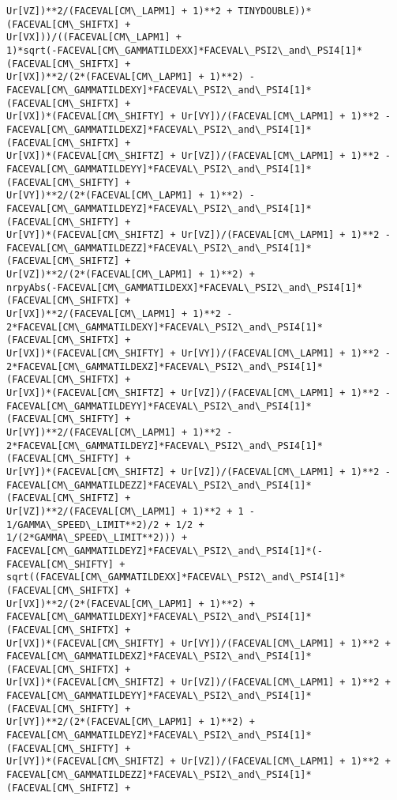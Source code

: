 \documentclass[landscape,letterpaper,10pt,english]{article}
\begin{document}
\begin{Verbatim}[commandchars=\\\{\}]
Ur[VZ])**2/(FACEVAL[CM\_LAPM1] + 1)**2 + TINYDOUBLE))*(FACEVAL[CM\_SHIFTX] +
Ur[VX]))/((FACEVAL[CM\_LAPM1] +
1)*sqrt(-FACEVAL[CM\_GAMMATILDEXX]*FACEVAL\_PSI2\_and\_PSI4[1]*(FACEVAL[CM\_SHIFTX] +
Ur[VX])**2/(2*(FACEVAL[CM\_LAPM1] + 1)**2) -
FACEVAL[CM\_GAMMATILDEXY]*FACEVAL\_PSI2\_and\_PSI4[1]*(FACEVAL[CM\_SHIFTX] +
Ur[VX])*(FACEVAL[CM\_SHIFTY] + Ur[VY])/(FACEVAL[CM\_LAPM1] + 1)**2 -
FACEVAL[CM\_GAMMATILDEXZ]*FACEVAL\_PSI2\_and\_PSI4[1]*(FACEVAL[CM\_SHIFTX] +
Ur[VX])*(FACEVAL[CM\_SHIFTZ] + Ur[VZ])/(FACEVAL[CM\_LAPM1] + 1)**2 -
FACEVAL[CM\_GAMMATILDEYY]*FACEVAL\_PSI2\_and\_PSI4[1]*(FACEVAL[CM\_SHIFTY] +
Ur[VY])**2/(2*(FACEVAL[CM\_LAPM1] + 1)**2) -
FACEVAL[CM\_GAMMATILDEYZ]*FACEVAL\_PSI2\_and\_PSI4[1]*(FACEVAL[CM\_SHIFTY] +
Ur[VY])*(FACEVAL[CM\_SHIFTZ] + Ur[VZ])/(FACEVAL[CM\_LAPM1] + 1)**2 -
FACEVAL[CM\_GAMMATILDEZZ]*FACEVAL\_PSI2\_and\_PSI4[1]*(FACEVAL[CM\_SHIFTZ] +
Ur[VZ])**2/(2*(FACEVAL[CM\_LAPM1] + 1)**2) +
nrpyAbs(-FACEVAL[CM\_GAMMATILDEXX]*FACEVAL\_PSI2\_and\_PSI4[1]*(FACEVAL[CM\_SHIFTX] +
Ur[VX])**2/(FACEVAL[CM\_LAPM1] + 1)**2 -
2*FACEVAL[CM\_GAMMATILDEXY]*FACEVAL\_PSI2\_and\_PSI4[1]*(FACEVAL[CM\_SHIFTX] +
Ur[VX])*(FACEVAL[CM\_SHIFTY] + Ur[VY])/(FACEVAL[CM\_LAPM1] + 1)**2 -
2*FACEVAL[CM\_GAMMATILDEXZ]*FACEVAL\_PSI2\_and\_PSI4[1]*(FACEVAL[CM\_SHIFTX] +
Ur[VX])*(FACEVAL[CM\_SHIFTZ] + Ur[VZ])/(FACEVAL[CM\_LAPM1] + 1)**2 -
FACEVAL[CM\_GAMMATILDEYY]*FACEVAL\_PSI2\_and\_PSI4[1]*(FACEVAL[CM\_SHIFTY] +
Ur[VY])**2/(FACEVAL[CM\_LAPM1] + 1)**2 -
2*FACEVAL[CM\_GAMMATILDEYZ]*FACEVAL\_PSI2\_and\_PSI4[1]*(FACEVAL[CM\_SHIFTY] +
Ur[VY])*(FACEVAL[CM\_SHIFTZ] + Ur[VZ])/(FACEVAL[CM\_LAPM1] + 1)**2 -
FACEVAL[CM\_GAMMATILDEZZ]*FACEVAL\_PSI2\_and\_PSI4[1]*(FACEVAL[CM\_SHIFTZ] +
Ur[VZ])**2/(FACEVAL[CM\_LAPM1] + 1)**2 + 1 - 1/GAMMA\_SPEED\_LIMIT**2)/2 + 1/2 +
1/(2*GAMMA\_SPEED\_LIMIT**2))) +
FACEVAL[CM\_GAMMATILDEYZ]*FACEVAL\_PSI2\_and\_PSI4[1]*(-FACEVAL[CM\_SHIFTY] +
sqrt((FACEVAL[CM\_GAMMATILDEXX]*FACEVAL\_PSI2\_and\_PSI4[1]*(FACEVAL[CM\_SHIFTX] +
Ur[VX])**2/(2*(FACEVAL[CM\_LAPM1] + 1)**2) +
FACEVAL[CM\_GAMMATILDEXY]*FACEVAL\_PSI2\_and\_PSI4[1]*(FACEVAL[CM\_SHIFTX] +
Ur[VX])*(FACEVAL[CM\_SHIFTY] + Ur[VY])/(FACEVAL[CM\_LAPM1] + 1)**2 +
FACEVAL[CM\_GAMMATILDEXZ]*FACEVAL\_PSI2\_and\_PSI4[1]*(FACEVAL[CM\_SHIFTX] +
Ur[VX])*(FACEVAL[CM\_SHIFTZ] + Ur[VZ])/(FACEVAL[CM\_LAPM1] + 1)**2 +
FACEVAL[CM\_GAMMATILDEYY]*FACEVAL\_PSI2\_and\_PSI4[1]*(FACEVAL[CM\_SHIFTY] +
Ur[VY])**2/(2*(FACEVAL[CM\_LAPM1] + 1)**2) +
FACEVAL[CM\_GAMMATILDEYZ]*FACEVAL\_PSI2\_and\_PSI4[1]*(FACEVAL[CM\_SHIFTY] +
Ur[VY])*(FACEVAL[CM\_SHIFTZ] + Ur[VZ])/(FACEVAL[CM\_LAPM1] + 1)**2 +
FACEVAL[CM\_GAMMATILDEZZ]*FACEVAL\_PSI2\_and\_PSI4[1]*(FACEVAL[CM\_SHIFTZ] +

\end{Verbatim}
\end{document}
